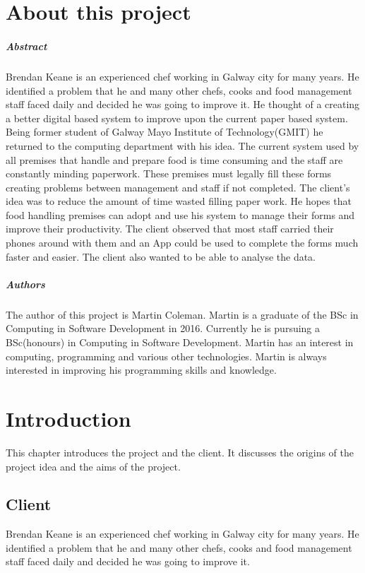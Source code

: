
\chapter*{About this project}
\paragraph{Abstract}
Brendan Keane is an experienced chef working in Galway city for many years. He identified a problem that he and many other chefs, cooks and food management staff faced daily and decided he was going to improve it.
He thought of a creating a better digital based system to improve upon the current paper based system. Being former student of Galway Mayo Institute of Technology(GMIT) he returned to the computing department with his idea.
The current system used by all premises that handle and prepare food is time consuming and the staff are constantly minding paperwork. These premises must legally fill these forms creating problems between management and staff if not completed.
The client’s idea was to reduce the amount of time wasted filling paper work. He hopes that food handling premises can adopt and use his system to manage their forms and improve their productivity. The client observed that most staff carried their phones around with them and an App could be used to complete the forms much faster and easier. The client also wanted to be able to analyse the data.


\paragraph{Authors}
The author of this project is Martin Coleman. Martin is a graduate of the BSc in Computing in Software Development in 2016. Currently he is pursuing a BSc(honours) in Computing in Software Development. Martin has an interest in computing, programming and various other technologies. Martin is always interested in improving his programming skills and knowledge.

\chapter{Introduction}
This chapter introduces the project and the client. It discusses the origins of the project idea and the aims of the project.

\section{Client}
Brendan Keane is an experienced chef working in Galway city for many years. He identified a problem that he and many other chefs, cooks and food management staff faced daily and decided he was going to improve it.

